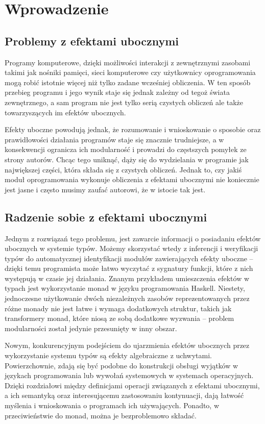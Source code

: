 \chapter{Wprowadzenie}

\section{Problemy z efektami ubocznymi}

Programy komputerowe, dzięki możliwości interakcji z zewnętrznymi zasobami takimi jak nośniki pamięci, sieci komputerowe czy użytkownicy oprogramowania mogą robić istotnie więcej niż tylko zadane wcześniej obliczenia. W ten sposób przebieg programu i jego wynik staje się jednak zależny od tegoż świata zewnętrznego, a sam program nie jest tylko serią czystych obliczeń ale także towarzyszących im efektów ubocznych.

Efekty uboczne powodują jednak, że rozumowanie i wnioskowanie o sposobie oraz prawidłowości działania programów staje się znacznie trudniejsze, a w konsekwencji ogranicza ich modularność i prowadzi do częstszych pomyłek ze strony autorów. Chcąc tego uniknąć, dąży się do wydzielania w programie jak największej części, która składa się z czystych obliczeń. Jednak to, czy jakiś moduł oprogramowania wykonuje obliczenia z efektami ubocznymi nie koniecznie jest jasne i często musimy zaufać autorowi, że w istocie tak jest.

\section{Radzenie sobie z efektami ubocznymi}

Jednym z rozwiązań tego problemu, jest zawarcie informacji o posiadaniu efektów ubocznych w systemie typów. Możemy skorzystać wtedy z inferencji i weryfikacji typów do automatycznej identyfikacji modułów zawierających efekty uboczne -- dzięki temu programista może łatwo wyczytać z sygnatury funkcji, które z nich występują w czasie jej działania. Znanym przykładem umieszczenia efektów w typach jest wykorzystanie monad w języku programowania Haskell. Niestety, jednoczesne użytkowanie dwóch niezależnych zasobów reprezentowanych przez różne monady nie jest łatwe i wymaga dodatkowych struktur, takich jak transformery monad, które niosą ze sobą dodatkowe wyzwania -- problem modularności został jedynie przesunięty w inny obszar.

Nowym, konkurencyjnym podejściem do ujarzmienia efektów ubocznych przez wykorzystanie systemu typów są efekty algebraiczne z uchwytami. Powierzchownie, zdają się być podobne do konstrukcji obsługi wyjątków w językach programowania lub wywołań systemowych w systemach operacyjnych. Dzięki rozdziałowi między definicjami operacji związanych z efektami ubocznymi, a ich semantyką oraz interesującemu zastosowaniu kontynuacji, dają łatwość myślenia i wnioskowania o programach ich używających. Ponadto, w przeciwieństwie do monad, można je bezproblemowo składać.


